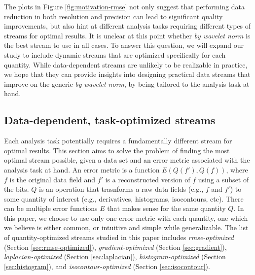 The plots in Figure \ref{fig:motivation-rmse} not only suggest that performing data reduction in
both resolution and precision can lead to significant quality improvements, but also hint at
different analysis tasks requiring different types of streams for optimal results. It is unclear at
this point whether \emph{by wavelet norm} is the best stream to use in all cases. To answer this
question, we will expand our study to include dynamic streams that are optimized specifically for
each quantity. While data-dependent streams are unlikely to be realizable in practice, we hope that
they can provide insights into designing practical data streams that improve on the generic \emph{by
wavelet norm}, by being tailored to the analysis task at hand.

\subsection{Data-dependent, task-optimized streams}
\label{sec:data_dep_streams}

Each analysis task potentially requires a fundamentally different stream for optimal results. This
section aims to solve the problem of finding the most optimal stream possible, given a data set and
an error metric associated with the analysis task at hand. An error metric is a function
$E(Q(f'),Q(f))$, where $f$ is the original data field and $f'$ is a reconstructed version of $f$
using a subset of the bits. $Q$ is an operation that trasnforms a raw data fields (e.g., $f$ and
$f'$) to some quantity of interest (e.g., derivatives, histograms, isocontours, etc). There can be
multiple error functions $E$ that makes sense for the same quantity $Q$. In this paper, we choose to
use only one error metric with each quantity, one which we believe is either common, or intuitive
and simple while generalizable. The list of quantity-optimized streams studied in
this paper includes \emph{rmse-optimized} (Section \ref{sec:rmse-optimized}),
\emph{gradient-optimized} (Section \ref{sec:gradient}), \emph{laplacian-optimized} (Section
\ref{sec:laplacian}), \emph{histogram-optimized} (Section \ref{sec:histogram}), and
\emph{isocontour-optimized} (Section \ref{sec:isocontour}).

